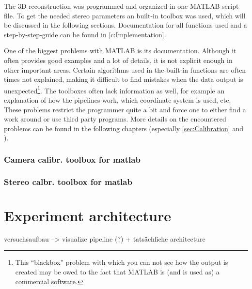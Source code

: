 The 3D reconstruction was programmed and organized in one MATLAB script file. To get the needed stereo parameters an built-in toolbox was used, which will be discussed in the following sections. Documentation for all functions used and a step-by-step-guide can be found in \autoref{c:Implementation}.

One of the biggest problems with MATLAB is its documentation. Although it often provides good examples and a lot of details, it is not explicit enough in other important areas. Certain algorithms used in the built-in functions are often times not explained, making it difficult to find mistakes when the data output is unexpected\footnote{This \enquote{blackbox} problem with which you can not see how the output is created may be owed to the fact that MATLAB is (and is used as) a commercial software.}. The toolboxes often lack information as well, for example an explanation of how the pipelines work, which coordinate system is used, etc. These problems restrict the programmer quite a bit and force one to either find a work around or use third party programs. More details on the encountered problems can be found in the following chapters (especially \autoref{sec:Calibration} and ).

\subsubsection{Camera calibr. toolbox for matlab}
\subsubsection{Stereo calbr. toolbox for matlab}




\section{Experiment architecture} \label{sec:architecture}
versuchsaufbau --> visualize pipeline (?) + tatsächliche architecture